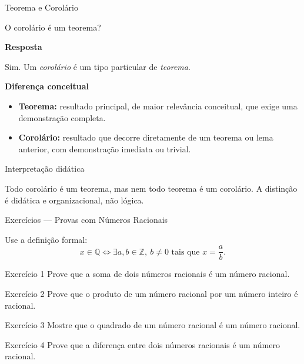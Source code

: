 \documentclass[9pt]{beamer}
\begin{document}
\begin{frame}{Teorema e Corolário}


O corolário é um teorema?
    \pause

\vspace{0.4cm}

\textbf{Resposta}

Sim. Um \emph{corolário} é um tipo particular de \emph{teorema}.

\vspace{0.4cm}

\textbf{Diferença conceitual}

\begin{itemize}
\item \textbf{Teorema:} resultado principal, de maior relevância conceitual,
que exige uma demonstração completa.
\item \textbf{Corolário:} resultado que decorre diretamente de um teorema
ou lema anterior, com demonstração imediata ou trivial.
\end{itemize}

\vspace{0.4cm}
    \pause

\begin{block}{Interpretação didática}


Todo corolário é um teorema, mas nem todo teorema é um corolário.
A distinção é didática e organizacional, não lógica.

\end{block}



\end{frame}


\begin{frame}{Exercícios — Provas com Números Racionais}

Use a definição formal:
\[
x \in \mathbb{Q} \iff \exists a,b \in \mathbb{Z},\ b \neq 0
\text{ tais que } x = \frac{a}{b}.
\]
\begin{block}{Exercício 1}
Prove que a soma de dois números racionais é um número racional.
\end{block}


\begin{block}{Exercício 2}
Prove que o produto de um número racional por um número inteiro é racional.
\end{block}


\begin{block}{Exercício 3}
Mostre que o quadrado de um número racional é um número racional.
\end{block}


\begin{block}{Exercício 4}
Prove que a diferença entre dois números racionais é um número racional.
\end{block}




\end{frame}
\end{document}
